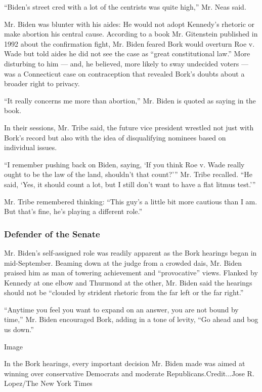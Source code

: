 ``Biden's street cred with a lot of the centrists was quite high,'' Mr.
Neas said.

Mr. Biden was blunter with his aides: He would not adopt Kennedy's
rhetoric or make abortion his central cause. According to a book Mr.
Gitenstein published in 1992 about the confirmation fight, Mr. Biden
feared Bork would overturn Roe v. Wade but told aides he did not see the
case as ``great constitutional law.'' More disturbing to him --- and, he
believed, more likely to sway undecided voters --- was a Connecticut
case on contraception that revealed Bork's doubts about a broader right
to privacy.

``It really concerns me more than abortion,'' Mr. Biden is quoted as
saying in the book.

In their sessions, Mr. Tribe said, the future vice president wrestled
not just with Bork's record but also with the idea of disqualifying
nominees based on individual issues.

``I remember pushing back on Biden, saying, `If you think Roe v. Wade
really ought to be the law of the land, shouldn't that count?''' Mr.
Tribe recalled. ``He said, `Yes, it should count a lot, but I still
don't want to have a flat litmus test.'''

Mr. Tribe remembered thinking: ``This guy's a little bit more cautious
than I am. But that's fine, he's playing a different role.''

\hypertarget{defender-of-the-senate}{%
\subsubsection{Defender of the Senate}\label{defender-of-the-senate}}

Mr. Biden's self-assigned role was readily apparent as the Bork hearings
began in mid-September. Beaming down at the judge from a crowded dais,
Mr. Biden praised him as man of towering achievement and ``provocative''
views. Flanked by Kennedy at one elbow and Thurmond at the other, Mr.
Biden said the hearings should not be ``clouded by strident rhetoric
from the far left or the far right.''

``Anytime you feel you want to expand on an answer, you are not bound by
time,'' Mr. Biden encouraged Bork, adding in a tone of levity, ``Go
ahead and bog us down.''

Image

In the Bork hearings, every important decision Mr. Biden made was aimed
at winning over conservative Democrats and moderate
Republicans.Credit...Jose R. Lopez/The New York Times

